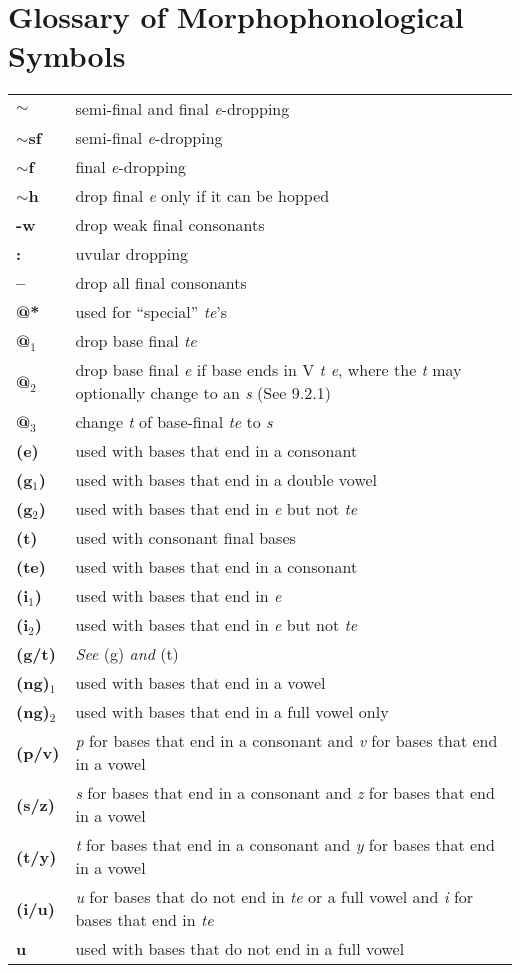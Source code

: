 \documentclass{article}
\begin{document}
\section{Glossary of Morphophonological Symbols}

\begin{tabular}{l l}

\textbf{$\sim$} & semi-final and final \textit{e}-dropping \\
\textbf{$\sim$sf} & semi-final \textit{e}-dropping \\
\textbf{$\sim$f} & final \textit{e}-dropping \\
\textbf{$\sim$h} & drop final \textit{e} only if it can be hopped \\
\textbf{-w} & drop weak final consonants \\
\textbf{:} & uvular dropping \\
\textbf{--} & drop all final consonants \\
\textbf{@*} & used for ``special'' \textit{te}'s \\
\textbf{@$_\text{1}$} & drop base final \textit{te} \\
\textbf{@$_\text{2}$} & drop base final \textit{e} if base ends in V \textit{t e}, where the \textit{t} may optionally change to an \textit{s} (See 9.2.1) \\
\textbf{@$_\text{3}$} & change \textit{t} of base-final \textit{te} to \textit{s} \\ 
\textbf{(e)} & used with bases that end in a consonant \\
\textbf{(g$_\text{1}$)} & used with bases that end in a double vowel \\
\textbf{(g$_\text{2}$)} & used with bases that end in \textit{e} but not \textit{te} \\
\textbf{(t)} & used with consonant final bases \\
\textbf{(te)} & used with bases that end in a consonant \\
\textbf{(i$_\text{1}$)} & used with bases that end in \textit{e} \\
\textbf{(i$_\text{2}$)} & used with bases that end in \textit{e} but not \textit{te} \\
\textbf{(g/t)} & \textit{See} (g) \textit{and} (t) \\
\textbf{(ng)$_\text{1}$} & used with bases that end in a vowel \\
\textbf{(ng)$_\text{2}$} & used with bases that end in a full vowel only \\
\textbf{(p/v)} & \textit{p} for bases that end in a consonant and \textit{v} for bases that end in a vowel \\
\textbf{(s/z)} & \textit{s} for bases that end in a consonant and \textit{z} for bases that end in a vowel \\
\textbf{(t/y)} & \textit{t} for bases that end in a consonant and \textit{y} for bases that end in a vowel \\
\textbf{(i/u)} & \textit{u} for bases that do not end in \textit{te} or a full vowel and \textit{i} for bases that end in \textit{te} \\
\textbf{u} & used with bases that do not end in a full vowel \\


\end{tabular}
\end{document}
